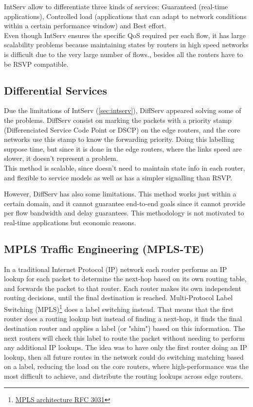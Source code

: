IntServ allow to differentiate three kinds of services: Guaranteed (real-time applications), Controlled load (applications that can adapt to network conditions within a certain performance window) and Best effort.\\



Even though IntServ ensures the specific QoS required per each flow, it has large scalability problems because maintaining states by routers in high speed networks is difficult due to the very large number of flows., besides all the routers have to be RSVP compatible.   

\subsection{Differential Services}
\label{sec:diffserv}

Due the limitations of IntServ (\ref{sec:intserv}), DiffServ appeared solving some of the problems. DiffServ consist on marking the packets with a priority stamp (Differenciated Service Code Point or DSCP) on the edge routers, and the core networks use this stamp to know the forwarding priority. Doing this labelling suppose time, but since it is done in the edge routers, where the links speed are slower, it doesn't represent a problem.\\

This method is scalable, since doesn't need to maintain state info in each router, and flexible to service models as well as has a simpler signalling than RSVP. 

However, DiffServ has also some limitations. This method works just within a certain domain, and it cannot guarantee end-to-end goals since it cannot provide per flow bandwidth and delay guarantees. This methodology is not motivated to real-time applications but economic reasons.  

\subsection{MPLS Traffic Engineering (MPLS-TE)}
\label{sec:mpls-te}
In a traditional Internet Protocol (IP) network each router performs an IP lookup for each packet to determine the next-hop based on its own routing table, and forwards the packet to that router. Each router makes its own independent routing decisions, until the final destination is reached.
Multi-Protocol Label Switching (MPLS)\footnote{\href{http://www.ietf.org/rfc/rfc3031.txt}{MPLS architecture RFC 3031}} does a label switching instead. That means that the first router does a routing lookup but instead of finding a next-hop, it finds the final destination router and applies a label (or "shim") based on this information. The next routers will check this label to route the packet without needing to perform any additional IP lookups. The idea was to have only the first router doing an IP lookup, then all future routes in the network could do switching matching based on a label, reducing the load on the core routers, where high-performance was the most difficult to achieve, and distribute the routing lookups across edge routers.

